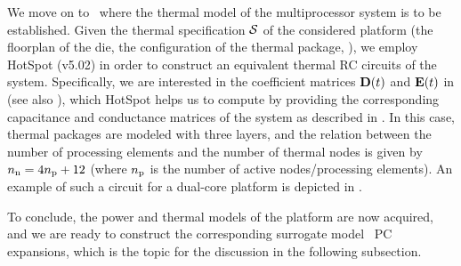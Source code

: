 We move on to \ where the thermal model of the multiprocessor system is to be established.
Given the thermal specification $\mathcal{S}$ of the considered platform (the floorplan of the die, the configuration of the thermal package, \etc), we employ HotSpot (v5.02) \cite{skadron2004} in order to construct an equivalent thermal RC circuits of the system.
Specifically, we are interested in the coefficient matrices $\mCF(\t)$ and $\mCS(\t)$ in  (see also ), which HotSpot helps us to compute by providing the corresponding capacitance and conductance matrices of the system as described in .
In this case, thermal packages are modeled with three layers, and the relation between the number of processing elements and the number of thermal nodes is given by ${n_\text{n}} = 4 {n_\text{p}} + 12$ (where ${n_\text{p}}$ is the number of active nodes/processing elements).
An example of such a circuit for a dual-core platform is depicted in .

To conclude, the power and thermal models of the platform are now acquired, and we are ready to construct the corresponding surrogate model \via\ PC expansions, which is the topic for the discussion in the following subsection.
